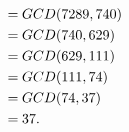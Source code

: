 \documentclass[11pt]{article}
\begin{document}
\begin{enumerate}[7.1]
\begin{enumerate}
\begin{align*}
      =\hspace{0.25em} & GCD(7289, 740)   & \\
      =\hspace{0.25em} & GCD(740, 629)     & \\
      =\hspace{0.25em} & GCD(629, 111)     & \\
      =\hspace{0.25em} & GCD(111, 74)       & \\
      =\hspace{0.25em} & GCD(74, 37)        & \\
      =\hspace{0.25em} & 37.
    \end{align*}
  \end{enumerate}
\end{enumerate}   
\end{document}
